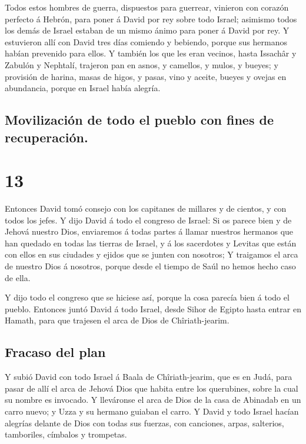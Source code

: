  Todos estos hombres de guerra, dispuestos para guerrear,
vinieron con corazón perfecto á Hebrón, para poner á David por rey sobre
todo Israel; asimismo todos los demás de Israel estaban de un mismo
ánimo para poner á David por rey.  Y estuvieron allí con
David tres días comiendo y bebiendo, porque sus hermanos habían
prevenido para ellos.  Y también los que les eran
vecinos, hasta Issachâr y Zabulón y Nephtalí, trajeron pan en asnos, y
camellos, y mulos, y bueyes; y provisión de harina, masas de higos, y
pasas, vino y aceite, bueyes y ovejas en abundancia, porque en Israel
había alegría.

\hypertarget{movilizaciuxf3n-de-todo-el-pueblo-con-fines-de-recuperaciuxf3n.}{%
\subsection{Movilización de todo el pueblo con fines de
recuperación.}\label{movilizaciuxf3n-de-todo-el-pueblo-con-fines-de-recuperaciuxf3n.}}

\hypertarget{section-12}{%
\section{13}\label{section-12}}

 Entonces David tomó consejo con los capitanes de millares
y de cientos, y con todos los jefes.  Y dijo David á todo
el congreso de Israel: Si os parece bien y de Jehová nuestro Dios,
enviaremos á todas partes á llamar nuestros hermanos que han quedado en
todas las tierras de Israel, y á los sacerdotes y Levitas que están con
ellos en sus ciudades y ejidos que se junten con nosotros;
 Y traigamos el arca de nuestro Dios á nosotros, porque
desde el tiempo de Saúl no hemos hecho caso de ella.

 Y dijo todo el congreso que se hiciese así, porque la
cosa parecía bien á todo el pueblo.  Entonces juntó David
á todo Israel, desde Sihor de Egipto hasta entrar en Hamath, para que
trajesen el arca de Dios de Chîriath-jearim.

\hypertarget{fracaso-del-plan}{%
\subsection{Fracaso del plan}\label{fracaso-del-plan}}

 Y subió David con todo Israel á Baala de Chîriath-jearim,
que es en Judá, para pasar de allí el arca de Jehová Dios que habita
entre los querubines, sobre la cual su nombre es invocado.
 Y lleváronse el arca de Dios de la casa de Abinadab en un
carro nuevo; y Uzza y su hermano guiaban el carro.  Y
David y todo Israel hacían alegrías delante de Dios con todas sus
fuerzas, con canciones, arpas, salterios, tamboriles, címbalos y
trompetas.

